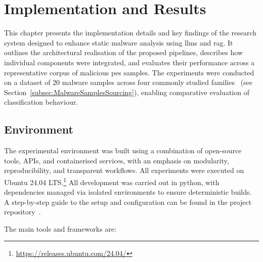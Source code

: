 \chapter{Implementation and Results}\label{sec:ImplementationAndResults}\label{Chapter4} %
This chapter presents the implementation details and key findings of the research system designed
to enhance static malware analysis using \glspl{llm} and \gls{rag}. It outlines the architectural
realisation of the proposed pipelines, describes how individual components were integrated, and
evaluates their performance across a representative corpus of malicious \glspl{pe} samples. The
experiments were conducted on a dataset of 20 malware samples across four commonly studied
families~\cite{berrios2025malware,abrazak2016rise,mat2021systematic} (see
Section~\ref{subsec:MalwareSamplesSourcing}), enabling comparative evaluation of classification
behaviour.

\section{Environment}\label{sec:Environment}
The experimental environment was built using a combination of open-source tools, APIs, and
containerised services, with an emphasis on modularity, reproducibility, and transparent workflows.
All experiments were executed on Ubuntu 24.04
LTS.\footnote{\url{https://releases.ubuntu.com/24.04/}} All development was carried out in
\gls{python}, with dependencies managed via isolated environments to ensure deterministic builds. A
step-by-step guide to the setup and configuration can be found in the project
repository~\cite{rexisRepo}.

The main tools and frameworks are:

